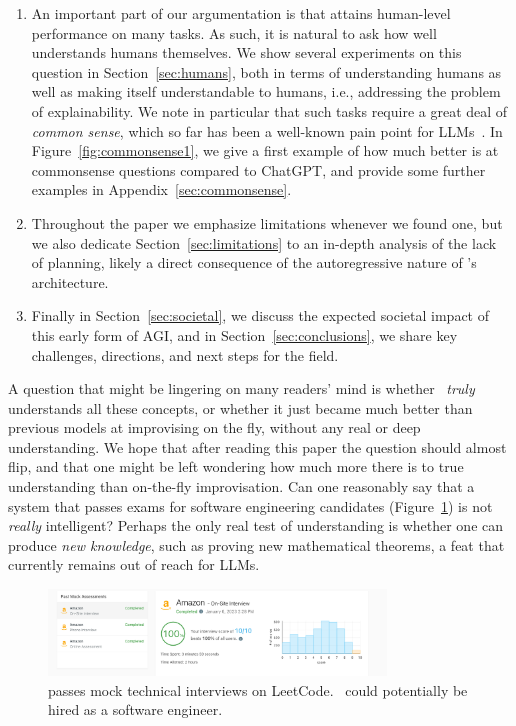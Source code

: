 \begin{enumerate}
    \item An important part of our argumentation is that {\DV} attains human-level performance on many tasks. As such, it is natural to ask how well {\DV} understands humans themselves. We show several experiments on this question in Section~\ref{sec:humans}, both in terms of understanding humans as well as {\DV} making itself understandable to humans, i.e., addressing the problem of explainability. We note in particular that such tasks require a great deal of {\em common sense}, which so far has been a well-known pain point for LLMs~\cite{davis2015commonsense}. In Figure~\ref{fig:commonsense1}, we give a first example of how much better {\DV} is at commonsense questions compared to ChatGPT, and provide some further examples in Appendix~\ref{sec:commonsense}.
    \item Throughout the paper we emphasize limitations whenever we found one, but we also dedicate Section~\ref{sec:limitations} to an in-depth analysis of the lack of planning, likely a direct consequence of the autoregressive nature of {\DV}'s architecture.
    \item Finally in Section~\ref{sec:societal}, we discuss the expected societal impact of this early form of AGI, and in Section~\ref{sec:conclusions}, we share key challenges, directions, and next steps for the field.
    \end{enumerate}
    
    A question that might be lingering on many readers' mind is whether \DV\ {\em truly} understands all these concepts, or whether it just became much better than previous models at improvising on the fly, without any real or deep understanding. We hope that after reading this paper the question should almost flip, and that one might be left wondering how much more there is to true understanding than on-the-fly improvisation. Can one reasonably say that a system that passes exams for software engineering candidates (Figure~\ref{fig:hired}) is not {\em really} intelligent? Perhaps the only real test of understanding is whether one can produce {\em new knowledge}, such as proving new mathematical theorems, a feat that currently remains out of reach for LLMs.
    
    \begin{figure}
        \centering
        \includegraphics[width=0.8\textwidth]{figures/hired.png}
        \caption{\DV passes mock technical interviews on LeetCode. \DV\ could potentially be hired as a software engineer\protect\footnotemark.}
        \label{fig:hired}
    \end{figure}
    

